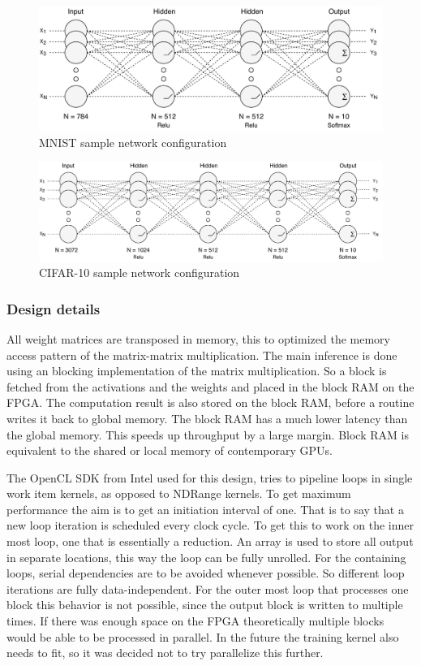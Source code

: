 \documentclass[techrep,english]{ipsj} %
\begin{document}
\begin{figure}[p]
  \centering
  \includegraphics[width=0.6\linewidth]{mnist-network.pdf}
  \caption{MNIST sample network configuration}\label{fig:mnist-network}
\end{figure}
\begin{figure}[p]
  \centering
  \includegraphics[width=0.8\linewidth]{cifar10-network.pdf}
  \caption{CIFAR-10 sample network configuration}\label{fig:cifar10-network}
\end{figure}

\subsubsection{Design details}
All weight matrices are transposed in memory, this to optimized the memory access pattern of the matrix-matrix multiplication.
The main inference is done using an blocking implementation of the matrix multiplication.
So a block is fetched from the activations and the weights and placed in the block RAM on the FPGA.
The computation result is also stored on the block RAM, before a routine writes it back to global memory.
The block RAM has a much lower latency than the global memory.
This speeds up throughput by a large margin.
Block RAM is equivalent to the shared or local memory of contemporary GPUs.

The OpenCL SDK from Intel used for this design, tries to pipeline loops in single work item kernels, as opposed to NDRange kernels. %
To get maximum performance the aim is to get an initiation interval of one.
That is to say that a new loop iteration is scheduled every clock cycle.
To get this to work on the inner most loop, one that is essentially a reduction.
An array is used to store all output in separate locations, this way the loop can be fully unrolled.
For the containing loops, serial dependencies are to be avoided whenever possible.
So different loop iterations are fully data-independent.
For the outer most loop that processes one block this behavior is not possible, since the output block is written to multiple times.
If there was enough space on the FPGA theoretically multiple blocks would be able to be processed in parallel.
In the future the training kernel also needs to fit, so it was decided not to try parallelize this further.
\end{document}

